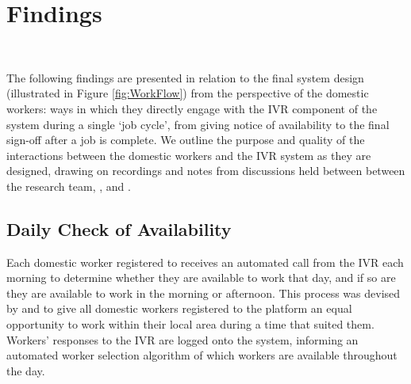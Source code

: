 \section{Findings}

\begin{figure*}
  \centering
  
  \caption{The designed workflow for a \PC{} order. The client requests a worker through the smartphone app (1). \PC{}'s algorithm chooses a suitable worker (2) and rings them to see if they will take the order (3). If so, the client is called by customer support, to ensure the order is genuine (4). If it is, the worker receives a confirmation call from the system (5) and is asked to give an ETA and leave towards the client's house. During the journey, the worker is called up three times to get an updated ETA (6). Upon arrival, the worker calls the system to log the work as having started (7) and completes the job (8). After finishing, the worker calls into the system to log the work as finished (9). At any time, the worker can call the system to get information about a current job or their wages, get help from the \PC{} office or emergency services, or to contact the client (X). }~\label{fig:WorkFlow}
\end{figure*}

The following findings are presented in relation to the final \PC{} system design (illustrated in Figure \ref{fig:WorkFlow}) from the perspective of the domestic workers: ways in which they directly engage with the IVR component of the system during a single `job cycle', from giving notice of availability to the final sign-off after a job is complete. We outline the purpose and quality of the interactions between the domestic workers and the IVR system as they are designed, drawing on recordings and notes from discussions held between between the research team, \PC{}, and \NGO{}.

\subsection{Daily Check of Availability}

Each domestic worker registered to \PC{} receives an automated call from the IVR each morning to determine whether they are available to work that day, and if so are they are available to work in the morning or afternoon. This process was devised by \PC{} and \NGO{} to give all domestic workers registered to the platform an equal opportunity to work within their local area during a time that suited them. Workers' responses to the IVR are logged onto the \PC{} system, informing an automated worker selection algorithm of which workers are available throughout the day. 

